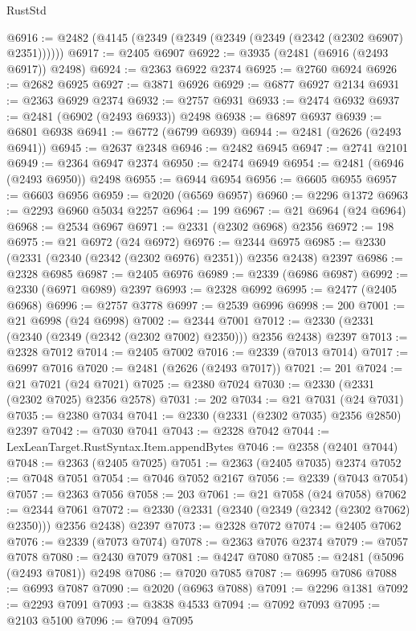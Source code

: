 \begin{lexlean}{RustStd}
\begin{coremodule}
@6916 := @2482 (@4145 (@2349 (@2349 (@2349 (@2349 (@2342 (@2302 @6907) @2351))))))
@6917 := @2405 @6907
@6922 := @3935 (@2481 (@6916 (@2493 @6917)) @2498)
@6924 := @2363 @6922 @2374
@6925 := @2760 @6924
@6926 := @2682 @6925
@6927 := @3871 @6926
@6929 := @6877 @6927 @2134
@6931 := @2363 @6929 @2374
@6932 := @2757 @6931
@6933 := @2474 @6932
@6937 := @2481 (@6902 (@2493 @6933)) @2498
@6938 := @6897 @6937
@6939 := @6801 @6938
@6941 := @6772 (@6799 @6939)
@6944 := @2481 (@2626 (@2493 @6941))
@6945 := @2637 @2348
@6946 := @2482 @6945
@6947 := @2741 @2101
@6949 := @2364 @6947 @2374
@6950 := @2474 @6949
@6954 := @2481 (@6946 (@2493 @6950)) @2498
@6955 := @6944 @6954
@6956 := @6605 @6955
@6957 := @6603 @6956
@6959 := @2020 (@6569 @6957)
@6960 := @2296 @1372
@6963 := @2293 @6960 @5034 @2257
@6964 := 199
@6967 := @21 @6964 (@24 @6964)
@6968 := @2534 @6967
@6971 := @2331 (@2302 @6968) @2356
@6972 := 198
@6975 := @21 @6972 (@24 @6972)
@6976 := @2344 @6975
@6985 := @2330 (@2331 (@2340 (@2342 (@2302 @6976) @2351)) @2356 @2438) @2397
@6986 := @2328 @6985
@6987 := @2405 @6976
@6989 := @2339 (@6986 @6987)
@6992 := @2330 (@6971 @6989) @2397
@6993 := @2328 @6992
@6995 := @2477 (@2405 @6968)
@6996 := @2757 @3778
@6997 := @2539 @6996
@6998 := 200
@7001 := @21 @6998 (@24 @6998)
@7002 := @2344 @7001
@7012 := @2330 (@2331 (@2340 (@2349 (@2342 (@2302 @7002) @2350))) @2356 @2438) @2397
@7013 := @2328 @7012
@7014 := @2405 @7002
@7016 := @2339 (@7013 @7014)
@7017 := @6997 @7016
@7020 := @2481 (@2626 (@2493 @7017))
@7021 := 201
@7024 := @21 @7021 (@24 @7021)
@7025 := @2380 @7024
@7030 := @2330 (@2331 (@2302 @7025) @2356 @2578)
@7031 := 202
@7034 := @21 @7031 (@24 @7031)
@7035 := @2380 @7034
@7041 := @2330 (@2331 (@2302 @7035) @2356 @2850) @2397
@7042 := @7030 @7041
@7043 := @2328 @7042
@7044 := LexLeanTarget.RustSyntax.Item.appendBytes
@7046 := @2358 (@2401 @7044)
@7048 := @2363 (@2405 @7025)
@7051 := @2363 (@2405 @7035) @2374
@7052 := @7048 @7051
@7054 := @7046 @7052 @2167
@7056 := @2339 (@7043 @7054)
@7057 := @2363 @7056
@7058 := 203
@7061 := @21 @7058 (@24 @7058)
@7062 := @2344 @7061
@7072 := @2330 (@2331 (@2340 (@2349 (@2342 (@2302 @7062) @2350))) @2356 @2438) @2397
@7073 := @2328 @7072
@7074 := @2405 @7062
@7076 := @2339 (@7073 @7074)
@7078 := @2363 @7076 @2374
@7079 := @7057 @7078
@7080 := @2430 @7079
@7081 := @4247 @7080
@7085 := @2481 (@5096 (@2493 @7081)) @2498
@7086 := @7020 @7085
@7087 := @6995 @7086
@7088 := @6993 @7087
@7090 := @2020 (@6963 @7088)
@7091 := @2296 @1381
@7092 := @2293 @7091
@7093 := @3838 @4533
@7094 := @7092 @7093
@7095 := @2103 @5100
@7096 := @7094 @7095

\end{coremodule}
\end{lexlean}
